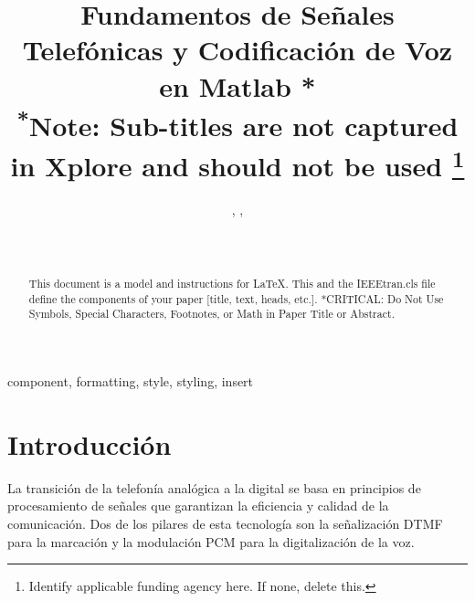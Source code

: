 \documentclass[journal]{IEEEtran} %
\begin{document}
\title{Fundamentos de Señales Telefónicas y Codificación de Voz en Matlab *\\
{\footnotesize \textsuperscript{*}Note: Sub-titles are not captured in Xplore and should not be used}
\thanks{Identify applicable funding agency here. If none, delete this.}
}

\author{%
    , %
    , %
    \\%
    \\%
    \\%
}

\maketitle

\begin{abstract}
    This document is a model and instructions for \LaTeX.
    This and the IEEEtran.cls file define the components of your paper [title, text, heads, etc.]. *CRITICAL: Do Not Use Symbols, Special Characters, Footnotes,
    or Math in Paper Title or Abstract.
\end{abstract}

\begin{IEEEkeywords}
    component, formatting, style, styling, insert
\end{IEEEkeywords}

\section{Introducción}
La transición de la telefonía analógica a la digital se basa en principios de procesamiento de señales que garantizan la eficiencia y calidad de la comunicación. Dos de los pilares de esta tecnología son la señalización DTMF para la marcación y la modulación PCM para la digitalización de la voz.
\end{document}
